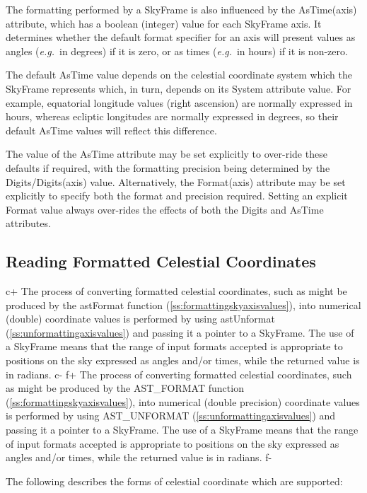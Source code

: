 \documentclass[twoside,11pt]{article}
\newcommand{\secref}[1]{\S\ref{#1}}
\renewcommand{\secref}[1]{\ref{#1}}
\begin{document}
The formatting performed by a SkyFrame is also influenced by the
AsTime(axis) attribute, which has a boolean (integer) value for each
SkyFrame axis.  It determines whether the default format specifier for
an axis will present values as angles ({\em{e.g.}}\ in degrees) if it
is zero, or as times ({\em{e.g.}}\ in hours) if it is non-zero.

The default AsTime value depends on the celestial coordinate system
which the SkyFrame represents which, in turn, depends on its System
attribute value. For example, equatorial longitude values (right
ascension) are normally expressed in hours, whereas ecliptic
longitudes are normally expressed in degrees, so their default AsTime
values will reflect this difference.

The value of the AsTime attribute may be set explicitly to over-ride
these defaults if required, with the formatting precision being
determined by the Digits/Digits(axis) value. Alternatively, the
Format(axis) attribute may be set explicitly to specify both the
format and precision required. Setting an explicit Format value always
over-rides the effects of both the Digits and AsTime attributes.

\subsection{\label{ss:unformattingskyaxisvalues}Reading Formatted Celestial Coordinates}

c+
The process of converting formatted celestial coordinates, such as
might be produced by the astFormat function
(\secref{ss:formattingskyaxisvalues}), into numerical (double)
coordinate values is performed by using astUnformat
(\secref{ss:unformattingaxisvalues}) and passing it a pointer to a
SkyFrame. The use of a SkyFrame means that the range of input formats
accepted is appropriate to positions on the sky expressed as angles
and/or times, while the returned value is in radians.
c-
f+
The process of converting formatted celestial coordinates, such as
might be produced by the AST\_FORMAT function
(\secref{ss:formattingskyaxisvalues}), into numerical (double
precision) coordinate values is performed by using AST\_UNFORMAT
(\secref{ss:unformattingaxisvalues}) and passing it a pointer to a
SkyFrame. The use of a SkyFrame means that the range of input formats
accepted is appropriate to positions on the sky expressed as angles
and/or times, while the returned value is in radians.
f-

The following describes the forms of celestial coordinate which are
supported:
\end{document}
